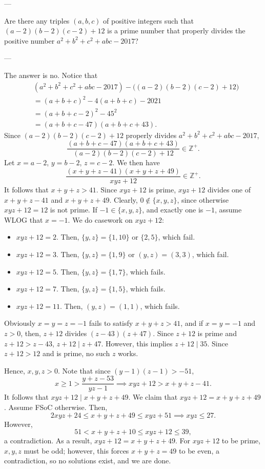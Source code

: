 
---

Are there any triples $(a,b,c)$ of positive integers such that $(a-2)(b-2)(c-2)+12$ is a prime number that properly divides the positive number $a^2+b^2+c^2+abc-2017$?

---

The answer is no. Notice that
\begin{align*}
    &\left(a^2+b^2+c^2+abc-2017\right)-\big((a-2)(b-2)(c-2)+12\big)\\
    &=(a+b+c)^2-4(a+b+c)-2021\\
    &=(a+b+c-2)^2-45^2\\
    &=(a+b+c-47)(a+b+c+43).
\end{align*}
Since $(a-2)(b-2)(c-2)+12$ properly divides $a^2+b^2+c^2+abc-2017$, \[\frac{(a+b+c-47)(a+b+c+43)}{(a-2)(b-2)(c-2)+12}\in\mathbb Z^+.\]
Let $x=a-2$, $y=b-2$, $z=c-2$. We then have \[\frac{(x+y+z-41)(x+y+z+49)}{xyz+12}\in\mathbb Z^+.\]
It follows that $x+y+z>41$. Since $xyz+12$ is prime, $xyz+12$ divides one of $x+y+z-41$ and $x+y+z+49$. Clearly, $0\notin\{x,y,z\}$, since otherwise $xyz+12=12$ is not prime. If $-1\in\{x,y,z\}$, and exactly one is $-1$, assume WLOG that $x=-1$. We do casework on $xyz+12$:
\begin{itemize}[itemsep=0em]
    \item $xyz+12=2$. Then, $\{y,z\}=\{1,10\}$ or $\{2,5\}$, which fail.
    \item $xyz+12=3$. Then, $\{y,z\}=\{1,9\}$ or $(y,z)=(3,3)$, which fail.
    \item $xyz+12=5$. Then, $\{y,z\}=\{1,7\}$, which fails.
    \item $xyz+12=7$. Then, $\{y,z\}=\{1,5\}$, which fails.
    \item $xyz+12=11$. Then, $(y,z)=(1,1)$, which fails.
\end{itemize}
Obviously $x=y=z=-1$ fails to satisfy $x+y+z>41$, and if $x=y=-1$ and $z>0$, then, $z+12$ divides $(z-43)(z+47)$. Since $z+12$ is prime and $z+12>z-43$, $z+12\mid z+47$. However, this implies $z+12\mid 35$. Since $z+12>12$ and is prime, no such $z$ works.

Hence, $x,y,z>0$. Note that since $(y-1)(z-1)>-51$, \[x\ge 1>\frac{y+z-53}{yz-1}\implies  xyz+12>x+y+z-41.\]
It follows that $xyz+12\mid x+y+z+49$. We claim that $xyz+12=x+y+z+49$. Assume FSoC otherwise. Then, \[2xyz+24\le x+y+z+49\le xyz+51\implies xyz\le 27.\]
However, \[51<x+y+z+10\le xyz+12\le 39,\]
a contradiction. As a result, $xyz+12=x+y+z+49$. For $xyz+12$ to be prime, $x,y,z$ must be odd; however, this forces $ x+y+z=49$ to be even, a contradiction, so no solutions exist, and we are done.
